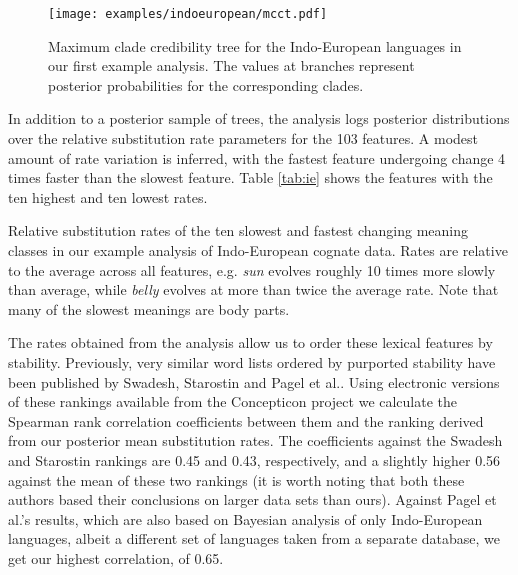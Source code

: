 \documentclass[10pt,a4paper]{article}
\begin{document}
\begin{figure}[t]
	\begin{center}
	\texttt{[image: examples/indoeuropean/mcct.pdf]}
	\end{center}
	\caption{Maximum clade credibility tree for the Indo-European languages in our first example analysis.  The values at branches represent posterior probabilities for the corresponding clades.}
\label{fig:ie}
\end{figure}

In addition to a posterior sample of trees, the analysis logs posterior distributions over the relative substitution rate parameters for the 103 features.  A modest amount of rate variation is inferred, with the fastest feature undergoing change 4 times faster than the slowest feature.  Table \ref{tab:ie} shows the features with the ten highest and ten lowest rates.  
\begin{table}[t]
	\begin{center}
		
	\end{center}
	\caption{Relative substitution rates of the ten slowest and fastest changing meaning classes in our example analysis of Indo-European cognate data.  Rates are relative to the average across all features, e.g. \emph{sun} evolves roughly 10 times more slowly than average, while \emph{belly} evolves at more than twice the average rate.  Note that many of the slowest meanings are body parts.}
\label{tab:ie}
\end{table}

The rates obtained from the analysis allow us to order these lexical features by stability.
Previously, very similar word lists ordered by purported stability have been published by Swadesh\cite{Swadesh1955}, Starostin\cite{Starostin2007} and Pagel et al.\cite{Pagel2007}.
Using electronic versions of these rankings available from the Concepticon project\cite{List2015} we calculate the Spearman rank correlation coefficients between them and the ranking derived from our posterior mean substitution rates. The coefficients against the Swadesh and Starostin rankings are 0.45 and 0.43, respectively, and a slightly higher 0.56 against the mean of these two rankings (it is worth noting that both these authors based their conclusions on larger data sets than ours).  Against Pagel et al.'s results, which are also based on Bayesian analysis of only Indo-European languages, albeit a different set of languages taken from a separate database, we get our highest correlation, of 0.65.
\end{document}
